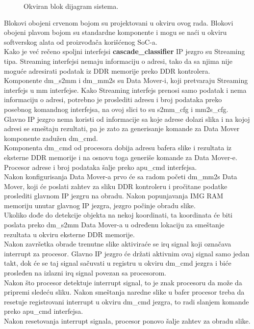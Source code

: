 \begin{figure}[H]
  \centering
  \resizebox{1\textwidth}{!}{%
    
  }
  \caption{Okviran blok dijagram sistema.}
  \label{system_bd_approx}
\end{figure}

Blokovi obojeni crvenom bojom su projektovani u okviru ovog rada.
Blokovi obojeni plavom bojom su standardne komponente i mogu se naći u okviru
softverskog alata od proizvođača korišćenog SoC-a. \\

Kako je već rečeno spoljni interfejsi \textbf{cascade\_classifier} IP jezgro su
Streaming tipa.
Streaming interfejsi nemaju informaciju o adresi, tako da sa njima nije
moguće adresirati podatak iz DDR memorije preko DDR kontrolera. \\

Komponente dm\_s2mm i dm\_mm2s su Data Mover-i, koji pretvaraju Streaming interfejs u \gls{mm}
interfejse.
Kako Streaming interfejs prenosi samo podatak i nema informaciju o
adresi, potrebno je proslediti adresu i broj podataka preko posebnog komandnog
interfejsa, na ovoj slici to su s2mm\_cfg i mm2s\_cfg.\\

Glavno IP jezgro nema koristi od informacije sa koje adrese dolazi slika i na
kojoj adresi se smeštaju rezultati, pa je zato za generisanje komande za Data Mover
komponente zadužen dm\_cmd.\\
Komponenta dm\_cmd od procesora dobija adresu bafera slike i rezultata iz eksterne DDR
memorije i na osnovu toga generiše komande za Data Mover-e. \\
Procesor adrese i broj podataka šalje preko apu\_cmd interfejsa. \\

Nakon konfigurisanja Data Mover-a prvo će sa radom početi dm\_mm2s Data Mover,
koji će poslati zahtev za sliku DDR kontroleru i pročitane podatke proslediti
glavnom IP jezgru na obradu.
Nakon popunjavanja IMG RAM memoriju unutar glavnog IP jezgra, jezgro počinje
obradu slike. \\

Ukoliko dođe do detekcije objekta na nekoj koordinati, ta koordinata će biti
poslata preko dm\_s2mm Data Mover-a u određenu lokaciju za smeštanje rezultata u
okviru eksterne DDR memorije. \\

Nakon završetka obrade trenutne slike aktiviraće se irq signal koji označava
interrupt za procesor.
Glavno IP jezgro će držati aktivnim ovaj signal samo jedan takt, dok će se taj
signal sačuvati u registru u okviru dm\_cmd jezgra i biće prosleđen na izlazni
irq signal povezan sa procesorom. \\
Nakon što procesor detektuje interrupt signal, to je znak procesoru da može da
pripremi sledeću sliku.
Nakon smeštanja naredne slike u bafer procesor treba da resetuje registrovani
interrupt u okviru dm\_cmd jezgra, to radi slanjem komande preko apu\_cmd
interfejsa. \\
Nakon resetovanja interrupt signala, procesor ponovo šalje zahtev za obradu
slike. \\

